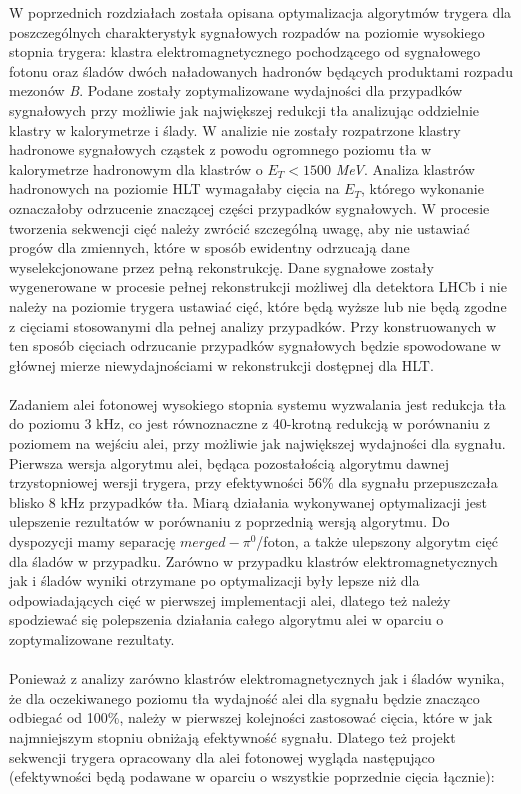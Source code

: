 \documentclass{pracamgr}
\begin{document}
W poprzednich rozdziałach została opisana optymalizacja algorytmów trygera dla poszczególnych charakterystyk sygnałowych rozpadów na poziomie wysokiego stopnia trygera: klastra elektromagnetycznego pochodzącego od sygnałowego fotonu oraz śladów dwóch naładowanych hadronów będących produktami rozpadu mezonów \textit{B}. Podane zostały zoptymalizowane wydajności dla przypadków sygnałowych przy możliwie jak największej redukcji tła analizując oddzielnie klastry w kalorymetrze i ślady. W analizie nie zostały rozpatrzone klastry hadronowe sygnałowych cząstek z powodu ogromnego poziomu tła w kalorymetrze hadronowym dla klastrów o $E_T<1500$ \textit{MeV}. Analiza klastrów hadronowych na poziomie HLT wymagałaby cięcia na $E_T$, którego wykonanie oznaczałoby odrzucenie znaczącej części przypadków sygnałowych. W procesie tworzenia sekwencji cięć należy zwrócić szczególną uwagę, aby nie ustawiać progów dla zmiennych, które w sposób ewidentny odrzucają dane wyselekcjonowane przez pełną rekonstrukcję. Dane sygnałowe zostały wygenerowane w procesie pełnej rekonstrukcji możliwej dla detektora LHCb i nie należy na poziomie trygera ustawiać cięć, które będą wyższe lub nie będą zgodne z cięciami stosowanymi dla pełnej analizy przypadków. Przy konstruowanych w ten sposób cięciach odrzucanie przypadków sygnałowych będzie spowodowane w głównej mierze niewydajnościami w rekonstrukcji dostępnej dla HLT.
\\\\
\noindent
Zadaniem alei fotonowej wysokiego stopnia systemu wyzwalania jest redukcja tła do poziomu 3 kHz, co jest równoznaczne z 40-krotną redukcją w porównaniu z poziomem na wejściu alei, przy możliwie jak największej wydajności dla sygnału. Pierwsza wersja algorytmu alei, będąca pozostałością algorytmu dawnej trzystopniowej wersji trygera, przy efektywności 56\% dla sygnału przepuszczała blisko 8 kHz przypadków tła. Miarą działania wykonywanej optymalizacji jest ulepszenie rezultatów w porównaniu z poprzednią wersją algorytmu. Do dyspozycji mamy separację $merged-\pi^0$/foton, a także ulepszony algorytm cięć dla śladów w przypadku. Zarówno w przypadku klastrów elektromagnetycznych jak i śladów wyniki otrzymane po optymalizacji były lepsze niż dla odpowiadających cięć w pierwszej implementacji alei, dlatego też należy spodziewać się polepszenia działania całego algorytmu alei w oparciu o zoptymalizowane rezultaty.
\\\\
\noindent
Ponieważ z analizy zarówno klastrów elektromagnetycznych jak i śladów wynika, że dla oczekiwanego poziomu tła wydajność alei dla sygnału będzie znacząco odbiegać od 100\%, należy w pierwszej kolejności zastosować cięcia, które w jak najmniejszym stopniu obniżają efektywność sygnału. Dlatego też projekt sekwencji trygera opracowany dla alei fotonowej wygląda następująco (efektywności będą podawane w oparciu o wszystkie poprzednie cięcia łącznie):
\end{document}
